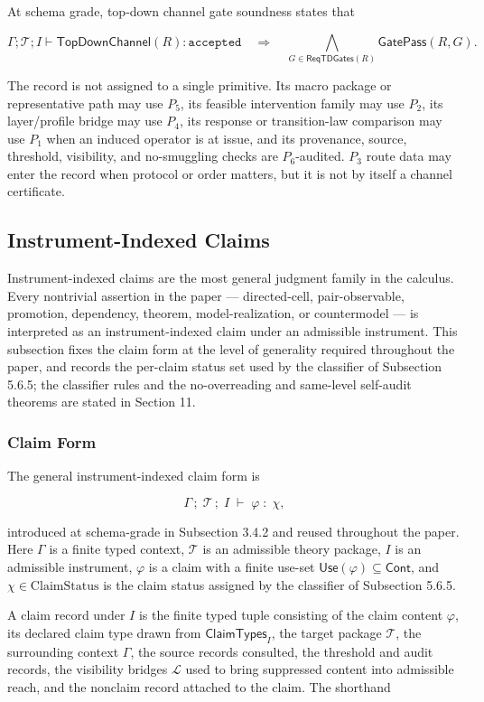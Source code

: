 \documentclass[11pt]{article}
\theoremstyle{definition}
\begin{document}
At schema grade, top-down channel gate soundness states that

\[
\Gamma;\mathcal T;I
\vdash
\mathsf{TopDownChannel}(R):\texttt{accepted}
\quad\Longrightarrow\quad
\bigwedge_{G\in\mathsf{ReqTDGates}(R)}\mathsf{GatePass}(R,G).
\]

The record is not assigned to a single primitive. Its macro package or representative path may use \(P_5\), its feasible intervention family may use \(P_2\), its layer/profile bridge may use \(P_4\), its response or transition-law comparison may use \(P_1\) when an induced operator is at issue, and its provenance, source, threshold, visibility, and no-smuggling checks are \(P_6\)-audited. \(P_3\) route data may enter the record when protocol or order matters, but it is not by itself a channel certificate.

\subsection{Instrument-Indexed Claims}

Instrument-indexed claims are the most general judgment family in the calculus. Every nontrivial assertion in the paper --- directed-cell, pair-observable, promotion, dependency, theorem, model-realization, or countermodel --- is interpreted as an instrument-indexed claim under an admissible instrument. This subsection fixes the claim form at the level of generality required throughout the paper, and records the per-claim status set used by the classifier of Subsection 5.6.5; the classifier rules and the no-overreading and same-level self-audit theorems are stated in Section 11.

\subsubsection{Claim Form}

The general instrument-indexed claim form is

\[
\Gamma\,;\;\mathcal T\,;\;I\;\vdash\;\varphi\;:\;\chi,
\]

introduced at schema-grade in Subsection 3.4.2 and reused throughout the paper. Here \(\Gamma\) is a finite typed context, \(\mathcal T\) is an admissible theory package, \(I\) is an admissible instrument, \(\varphi\) is a claim with a finite use-set \(\mathsf{Use}(\varphi)\subseteq\mathsf{Cont}\), and \(\chi\in\mathrm{ClaimStatus}\) is the claim status assigned by the classifier of Subsection 5.6.5.

A claim record under \(I\) is the finite typed tuple consisting of the claim content \(\varphi\), its declared claim type drawn from \(\mathsf{ClaimTypes}_I\), the target package \(\mathcal T\), the surrounding context \(\Gamma\), the source records consulted, the threshold and audit records, the visibility bridges \(\mathcal L\) used to bring suppressed content into admissible reach, and the nonclaim record attached to the claim. The shorthand
\end{document}
